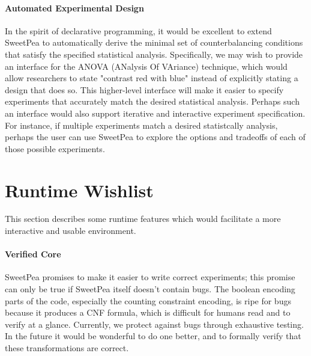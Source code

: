 \paragraph*{Automated Experimental Design}
In the spirit of declarative programming, it would be excellent to extend SweetPea to automatically derive the minimal set of counterbalancing conditions that satisfy the specified statistical analysis. Specifically, we may wish to provide an interface for the ANOVA (ANalysis Of VAriance) technique, which would allow researchers to state "contrast red with blue" instead of explicitly stating a design that does so. This higher-level interface will make it easier to specify experiments that accurately match the desired statistical analysis. Perhaps such an interface would also support iterative and interactive experiment specification. For instance, if multiple experiments match a desired statistcally analysis, perhaps the user can use SweetPea to explore the options and tradeoffs of each of those possible experiments.



\section{Runtime Wishlist}

This section describes some runtime features which would facilitate a more interactive and usable environment.


\paragraph*{Verified Core}

SweetPea promises to make it easier to write correct experiments; this promise can only be true if SweetPea itself doesn't contain bugs. The boolean encoding parts of the code, especially the counting constraint encoding, is ripe for bugs because it produces a CNF formula, which is difficult for humans read and to verify at a glance. Currently, we protect against bugs through exhaustive testing. In the future it would be wonderful to do one better, and to formally verify that these transformations are correct.

